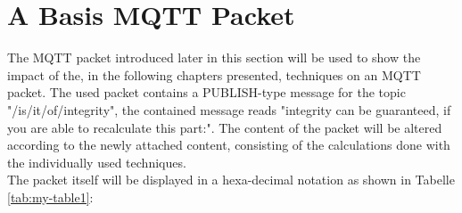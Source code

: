 \section{A Basis MQTT Packet}

The MQTT packet introduced later in this section will be used to show the impact
of the, in the following chapters presented, techniques on an MQTT packet.
The used packet contains a PUBLISH-type message for the topic \\ "/is/it/of/integrity",
the contained message reads "integrity can be guaranteed, if you are able to recalculate
this part:". The content of the packet will be altered according to the
newly attached content, consisting of the calculations done with the individually
used techniques.
 \\
\newpage
The packet itself will be displayed in a hexa-decimal notation as shown in Tabelle \ref{tab:my-table1}: \\

